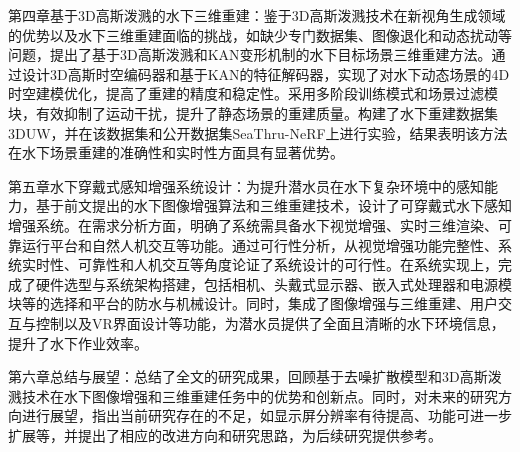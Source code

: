 第四章基于3D高斯泼溅的水下三维重建：鉴于3D高斯泼溅技术在新视角生成领域的优势以及水下三维重建面临的挑战，如缺少专门数据集、图像退化和动态扰动等问题，提出了基于3D高斯泼溅和KAN变形机制的水下目标场景三维重建方法。通过设计3D高斯时空编码器和基于KAN的特征解码器，实现了对水下动态场景的4D时空建模优化，提高了重建的精度和稳定性。采用多阶段训练模式和场景过滤模块，有效抑制了运动干扰，提升了静态场景的重建质量。构建了水下重建数据集3DUW，并在该数据集和公开数据集SeaThru-NeRF上进行实验，结果表明该方法在水下场景重建的准确性和实时性方面具有显著优势。

第五章水下穿戴式感知增强系统设计：为提升潜水员在水下复杂环境中的感知能力，基于前文提出的水下图像增强算法和三维重建技术，设计了可穿戴式水下感知增强系统。在需求分析方面，明确了系统需具备水下视觉增强、实时三维渲染、可靠运行平台和自然人机交互等功能。通过可行性分析，从视觉增强功能完整性、系统实时性、可靠性和人机交互等角度论证了系统设计的可行性。在系统实现上，完成了硬件选型与系统架构搭建，包括相机、头戴式显示器、嵌入式处理器和电源模块等的选择和平台的防水与机械设计。同时，集成了图像增强与三维重建、用户交互与控制以及VR界面设计等功能，为潜水员提供了全面且清晰的水下环境信息，提升了水下作业效率。

第六章总结与展望：总结了全文的研究成果，回顾基于去噪扩散模型和3D高斯泼溅技术在水下图像增强和三维重建任务中的优势和创新点。同时，对未来的研究方向进行展望，指出当前研究存在的不足，如显示屏分辨率有待提高、功能可进一步扩展等，并提出了相应的改进方向和研究思路，为后续研究提供参考。 
